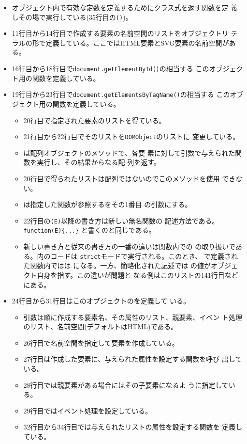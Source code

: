 \begin{itemize}
 \item オブジェクト内で有効な定数を定義するためにクラス式を返す関数を定
       義しその場で実行している(35行目の\texttt{()})。
 \item 11行目から14行目で作成する要素の名前空間のリストをオブジェクトリ
       テラルの形で定義している。ここではHTML要素とSVG要素の名前空間があ
       る。
 \item 16行目から18行目で\texttt{document.getElementById()}の相当する
       このオブジェクト用の関数を定義している。
 \item 19行目から23行目で\texttt{document.getElementsByTagName()}の相当する
       このオブジェクト用の関数を定義している。
       \begin{itemize}
        \item 20行目で指定された要素のリストを得ている。
        \item 21行目から22行目でそのリストを\texttt{DOMObject}のリストに
              変更している。
        \item {}は配列オブジェクトのメソッドで、各要
              素に対して引数で与えられた関数を実行し、その結果からなる配
              列を返す。
        \item 20行目で得られたリストは配列ではないのでこのメソッドを使用
              できない。
        \item {}は指定した関数が参照するをその1番目
              の引数にする。
        \item 22行目の\texttt{(E)}以降の書き方は新しい無名関数の
              記述方法である。\Verb+function(E){...}+
              と書くのと同じである。
        \item 新しい書き方と従来の書き方の一番の違いは関数内での
              の取り扱いである。内のコードは
              \texttt{strict}モードで実行される。このとき、
              で定義された関数内ではは
              になる。一方、簡略化された記述では
              の値がオブジェクト自身を指す。この違いが問題と
              なる例はこのリストの141行目などにある。
       \end{itemize}
 \item 24行目から31行目はこのオブジェクトのを定義して
       いる。
       \begin{itemize}
        \item 引数は順に作成する要素名、その属性のリスト、親要素、イベン
              ト処理のリスト、名前空間(デフォルトはHTML)である。
        \item 26行目で名前空間を指定して要素を作成している。
        \item 27行目は作成した要素に、与えられた属性を設定する関数を呼び
              出している。
        \item 28行目では親要素がある場合にはその子要素になるよ
              うに指定している。
        \item 29行目ではイベント処理を設定している。
        \item 32行目から34行目では与えられたリストの属性を設定する関数を
              定義している。
       \end{itemize}
\end{itemize}
